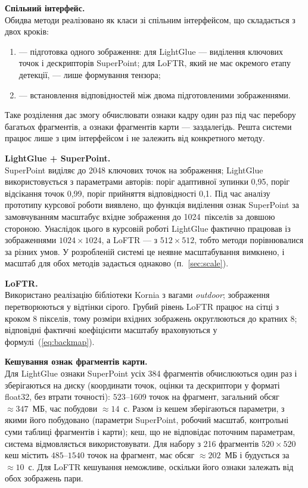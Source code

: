 \documentclass[a4paper, 12pt, titlepage]{article}
\begin{document}
\textbf{Спільний інтерфейс.}\\
Обидва методи реалізовано як класи зі спільним інтерфейсом, що складається з двох кроків:
\begin{enumerate}
    \item {} --- підготовка одного зображення: для LightGlue --- виділення ключових точок і дескрипторів SuperPoint; для LoFTR, який не має окремого етапу детекції, --- лише формування тензора;
    \item {} --- встановлення відповідностей між двома підготовленими зображеннями.
\end{enumerate}
Таке розділення дає змогу обчислювати ознаки кадру один раз під час перебору багатьох фрагментів, а ознаки фрагментів карти --- заздалегідь. Решта системи працює лише з цим інтерфейсом і не залежить від конкретного методу.

\textbf{LightGlue + SuperPoint.}\\
SuperPoint виділяє до 2048 ключових точок на зображення; LightGlue використовується з параметрами авторів: поріг адаптивної зупинки 0,95, поріг відсікання точок 0,99, поріг прийняття відповідності 0,1. Під час аналізу прототипу курсової роботи виявлено, що функція виділення ознак SuperPoint за замовчуванням масштабує вхідне зображення до 1024~пікселів за довшою стороною. Унаслідок цього в курсовій роботі LightGlue фактично працював із зображеннями $1024 \times 1024$, а LoFTR --- з $512 \times 512$, тобто методи порівнювалися за різних умов. У розробленій системі це неявне масштабування вимкнено, і масштаб для обох методів задається однаково (п.~\ref{sec:scale}).

\textbf{LoFTR.}\\
Використано реалізацію бібліотеки Kornia з вагами \textit{outdoor}; зображення перетворюються у відтінки сірого. Грубий рівень LoFTR працює на сітці з кроком 8 пікселів, тому розміри вхідних зображень округлюються до кратних 8; відповідні фактичні коефіцієнти масштабу враховуються у формулі~(\ref{eq:backmap}).

\textbf{Кешування ознак фрагментів карти.}\\
Для LightGlue ознаки SuperPoint усіх 384 фрагментів обчислюються один раз і зберігаються на диску (координати точок, оцінки та дескриптори у форматі float32, без втрати точності): $523$--$1609$ точок на фрагмент, загальний обсяг $\approx 347$~МБ, час побудови $\approx 14$~с. Разом із кешем зберігаються параметри, з якими його побудовано (параметри SuperPoint, робочий масштаб, контрольні суми таблиці фрагментів і карти); кеш, що не відповідає поточним параметрам, система відмовляється використовувати. Для набору з 216 фрагментів $520 \times 520$ кеш містить $485$--$1540$ точок на фрагмент, має обсяг $\approx 202$~МБ і будується за $\approx 10$~с. Для LoFTR кешування неможливе, оскільки його ознаки залежать від обох зображень пари.
\end{document}

